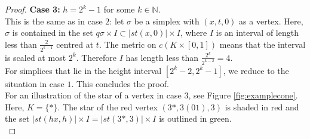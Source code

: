 \documentclass[a4paper,11pt]{article}
\theoremstyle{definition}
\theoremstyle{plain}
\theoremstyle{remark}
\begin{document}
\begin{proof}
\textbf{Case 3:}  $h = 2^{k}-1$ for some $k\in \mathbb{N}$.\\

This is the same as in case $2$: let $\sigma$ be a simplex with $(x,t,0)$ as a vertex. Here, $\sigma$ is contained in the set $q\sigma \times I \subset |st(x,0)| \times I$, where $I$ is an interval of length less than $\frac{2}{2^{k-1}}$ centred at $t$. The metric on $c(K \times [0,1])$ means that the interval is scaled at most $2^{k}$. Therefore $I$ has length less than $\frac{2^{k}}{2^{k-2}} = 4$. \\

For simplices that lie in the height interval $[2^{k}-2,2^{k}-1]$, we reduce to the situation in case $1$. This concludes the proof.\\

For an illustration of the star of a vertex in case $3$, see Figure \ref{fig:examplecone}. Here, $K = \{\ast\}$. The star of the red vertex $(3\ast, 3(01),3)$ is shaded in red and the set $|st(hx,h)| \times I = |st(3\ast,3)| \times I$ is outlined in green.\\
\end{proof}
\end{document}
